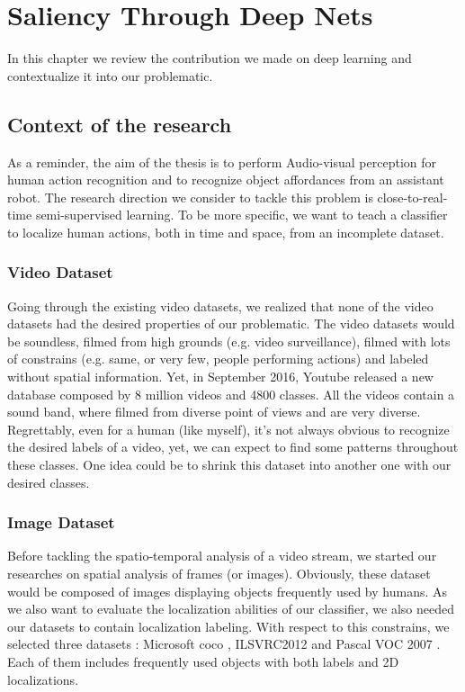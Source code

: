 \chapter{Saliency Through Deep Nets} %
\label{sec:saliency_through_deep_nets}
	
	In this chapter we review the contribution we made on deep learning and contextualize it into our problematic.

	\section{Context of the research}
	\label{sec:context_of_the_research}

		As a reminder, the aim of the thesis is to perform Audio-visual perception for human action recognition and to recognize object affordances from an assistant robot. The research direction we consider to tackle this problem is close-to-real-time semi-supervised learning. To be more specific, we want to teach a classifier to localize human actions, both in time and space, from an incomplete dataset. 	

		\subsection{Video Dataset}
		\label{sub:dataset}
			Going through the existing video datasets, we realized that none of the video datasets had the desired properties of our problematic. The video datasets would be soundless, filmed from high grounds (e.g. video surveillance), filmed with lots of constrains (e.g. same, or very few, people performing actions) and labeled without spatial information. Yet, in September 2016, Youtube released a new database \cite{abu2016youtube} composed by 8 million videos and 4800 classes. All the videos contain a sound band, where filmed from diverse point of views and are very diverse. Regrettably, even for a human (like myself), it's not always obvious to recognize the desired labels of a video, yet, we can expect to find some patterns throughout these classes. One idea could be to shrink this dataset into another one with our desired classes.


		\subsection{Image Dataset}
		\label{sub:image_dataset}
			Before tackling the spatio-temporal analysis of a video stream, we started our researches on spatial analysis of frames (or images). Obviously, these dataset would be composed of images displaying objects frequently used by humans. As we also want to evaluate the localization abilities of our classifier, we also needed our datasets to contain localization labeling. With respect to this constrains, we selected three datasets : Microsoft coco \cite{lin2014microsoft}, ILSVRC2012 \cite{ILSVRC15} and Pascal VOC 2007 \cite{pascalVoc2007}. Each of them includes frequently used objects with both labels and 2D localizations.




